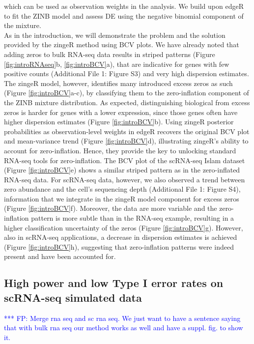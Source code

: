 \documentclass{bmcart}
\newcommand{\fanny}[1]{\textcolor{blue}{*** FP: #1}}
\begin{document}
which can be used as observation weights in the analysis.
We build upon edgeR to fit the ZINB model and assess DE using the negative binomial component of the mixture.\\
As in the introduction, we will demonstrate the problem and the solution provided by the zingeR method using BCV plots.
We have already noted that adding zeros to bulk RNA-seq data results in striped patterns (Figure  \ref{fig:introRNAseq}b, \ref{fig:introBCV}a), that are indicative for genes with few positive counts (Additional File 1: Figure S3) and very high dispersion estimates.
The zingeR model, however, identifies many introduced excess zeros as such (Figure \ref{fig:introBCV}a-c), by classifying them to the zero-inflation component of the ZINB mixture distribution.
As expected, distinguishing biological from excess zeros is harder for genes with a lower expression, since those genes often have higher dispersion estimates (Figure \ref{fig:introBCV}b).
Using zingeR posterior probabilities as observation-level weights in edgeR recovers the original BCV plot and mean-variance trend (Figure \ref{fig:introBCV}d), illustrating zingeR's ability to account for zero-inflation.
Hence, they provide the key to unlocking standard RNA-seq tools for zero-inflation.
The BCV plot of the scRNA-seq Islam dataset (Figure \ref{fig:introBCV}e) shows a similar striped pattern as in the zero-inflated RNA-seq data.
For scRNA-seq data, however, we also observed a trend between zero abundance and the cell's sequencing depth (Additional File 1: Figure S4), information that we integrate in the zingeR model component for excess zeros (Figure \ref{fig:introBCV}f).
Moreover, the data are more variable and the zero-inflation pattern is more subtle than in the RNA-seq example, resulting in a higher classification uncertainty of the zeros  (Figure \ref{fig:introBCV}g). 
However, also in scRNA-seq applications, a decrease in dispersion estimates is achieved (Figure \ref{fig:introBCV}h), suggesting that zero-inflation patterns were indeed present and have been accounted for.

\subsection*{High power and low Type I error rates on scRNA-seq simulated data}

\fanny{Merge rna seq and sc rna seq. We just want to have a sentence saying that with bulk rna seq our method works as well and have a suppl. fig. to show it.}
\end{document}
